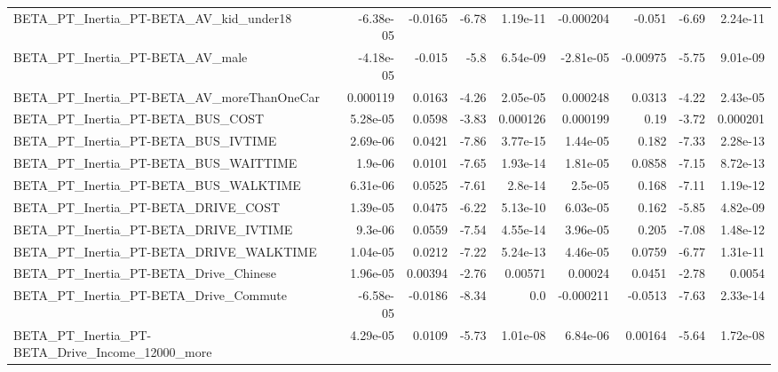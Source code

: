 \begin{tabular}{lrrrrrrrr}
BETA\_PT\_Inertia\_PT-BETA\_AV\_kid\_under18             &   -6.38e-05 &      -0.0165 &    -6.78 & 1.19e-11 &  -0.000204 &      -0.051 &        -6.69 &      2.24e-11 \\
BETA\_PT\_Inertia\_PT-BETA\_AV\_male                    &   -4.18e-05 &       -0.015 &     -5.8 & 6.54e-09 &  -2.81e-05 &    -0.00975 &        -5.75 &      9.01e-09 \\
BETA\_PT\_Inertia\_PT-BETA\_AV\_moreThanOneCar          &    0.000119 &       0.0163 &    -4.26 & 2.05e-05 &   0.000248 &      0.0313 &        -4.22 &      2.43e-05 \\
BETA\_PT\_Inertia\_PT-BETA\_BUS\_COST                   &    5.28e-05 &       0.0598 &    -3.83 & 0.000126 &   0.000199 &        0.19 &        -3.72 &      0.000201 \\
BETA\_PT\_Inertia\_PT-BETA\_BUS\_IVTIME                 &    2.69e-06 &       0.0421 &    -7.86 & 3.77e-15 &   1.44e-05 &       0.182 &        -7.33 &      2.28e-13 \\
BETA\_PT\_Inertia\_PT-BETA\_BUS\_WAITTIME               &     1.9e-06 &       0.0101 &    -7.65 & 1.93e-14 &   1.81e-05 &      0.0858 &        -7.15 &      8.72e-13 \\
BETA\_PT\_Inertia\_PT-BETA\_BUS\_WALKTIME               &    6.31e-06 &       0.0525 &    -7.61 &  2.8e-14 &    2.5e-05 &       0.168 &        -7.11 &      1.19e-12 \\
BETA\_PT\_Inertia\_PT-BETA\_DRIVE\_COST                 &    1.39e-05 &       0.0475 &    -6.22 & 5.13e-10 &   6.03e-05 &       0.162 &        -5.85 &      4.82e-09 \\
BETA\_PT\_Inertia\_PT-BETA\_DRIVE\_IVTIME               &     9.3e-06 &       0.0559 &    -7.54 & 4.55e-14 &   3.96e-05 &       0.205 &        -7.08 &      1.48e-12 \\
BETA\_PT\_Inertia\_PT-BETA\_DRIVE\_WALKTIME             &    1.04e-05 &       0.0212 &    -7.22 & 5.24e-13 &   4.46e-05 &      0.0759 &        -6.77 &      1.31e-11 \\
BETA\_PT\_Inertia\_PT-BETA\_Drive\_Chinese              &    1.96e-05 &      0.00394 &    -2.76 &  0.00571 &    0.00024 &      0.0451 &        -2.78 &        0.0054 \\
BETA\_PT\_Inertia\_PT-BETA\_Drive\_Commute              &   -6.58e-05 &      -0.0186 &    -8.34 &      0.0 &  -0.000211 &     -0.0513 &        -7.63 &      2.33e-14 \\
BETA\_PT\_Inertia\_PT-BETA\_Drive\_Income\_12000\_more    &    4.29e-05 &       0.0109 &    -5.73 & 1.01e-08 &   6.84e-06 &     0.00164 &        -5.64 &      1.72e-08 \\

\end{tabular}
